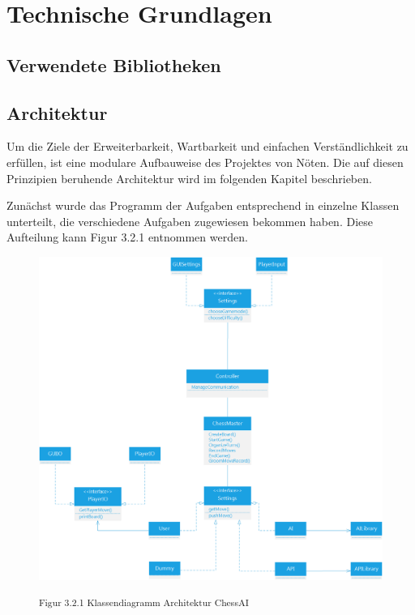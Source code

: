 
\chapter{Technische Grundlagen}

\section{Verwendete Bibliotheken}

\section{Architektur}

Um die Ziele der Erweiterbarkeit, Wartbarkeit und einfachen Verständlichkeit zu erfüllen, ist eine modulare Aufbauweise des Projektes von Nöten. Die auf diesen Prinzipien beruhende Architektur wird im folgenden Kapitel beschrieben.

Zunächst wurde das Programm der Aufgaben entsprechend in einzelne Klassen unterteilt, die verschiedene Aufgaben zugewiesen bekommen haben. Diese Aufteilung kann Figur 3.2.1 entnommen werden.

\begin{figure}[h]
\centering
\includegraphics[width=\textwidth*4/5]{images/architecture_class_diagram.png}

\textsuperscript{Figur 3.2.1 Klassendiagramm Architektur ChessAI}
\end{figure}

